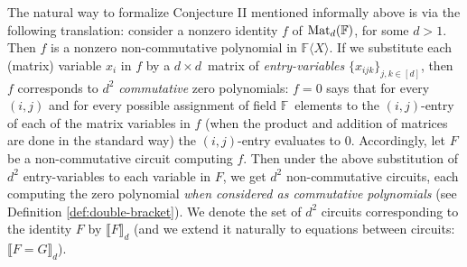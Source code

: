 \documentclass[12pt,reqno]{article}
\newcommand\F{\ensuremath{\mathbb F}}
\newcommand\PP{{\mathbb P}}
\newcommand\PC{\ensuremath{\PP_c}}
\newcommand\PMd{\ensuremath{\PP_{{\rm Mat}_d}(\F)}}
\newcommand{\matd}{{\ensuremath{{\rm Mat}_d(\F)}}}
\newcommand{\freea}{\ensuremath{\F\langle X\rangle}}
\newcommand{\dbyd}{\ensuremath{d\times d}}
\begin{document}







The natural way to formalize Conjecture II mentioned  informally above  is via the following  translation: consider a nonzero identity $f$ of \matd, for some $d>1$. Then $f$ is a nonzero non-commutative polynomial in \freea. If we substitute each (matrix) variable $x_i$ in $f$ by a \dbyd\ matrix of \emph{entry-variables} $\{x_{ijk}\}_{j,k\in[d]}$, then  $f$ corresponds to $d^2$ \textit{commutative }zero polynomials: $f=0$ says that for  every $(i,j)$ and for every possible assignment of field \F\ elements to the $(i,j)$-entry of each of the matrix variables in $f$ (when the product and addition of matrices are done in the standard way) the $(i,j)$-entry evaluates to $0$.
Accordingly, let $F$ be a non-commutative circuit computing $f$. Then under the above substitution of $d^2$ entry-variables to each variable in $F$, we get $d^2$  non-commutative circuits, each computing the zero polynomial \emph{when considered as commutative polynomials} (see Definition \ref{def:double-bracket}). We denote the set of $d^2$ circuits   corresponding to the identity $F$ by $\llbracket F\rrbracket _d  $ (and we  extend it naturally to equations between circuits: $\llbracket F=G\rrbracket _d$).
\end{document}
